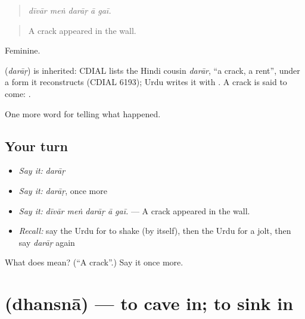 \begin{quote}
    
\end{quote}

\begin{quote}
\emph{dīvār meṅ darāṛ ā gaī.}
\end{quote}

\begin{quote}
A crack appeared in the wall.
\end{quote}

Feminine.

\begin{cousinweb}
\textbf{} (\emph{darāṛ}) is inherited: CDIAL lists the Hindi cousin \emph{darār}, \textquotedblleft{}a crack, a rent\textquotedblright{}, under a form it reconstructs (CDIAL 6193); Urdu writes it with \textbf{}. A crack is said to come: \textbf{  }.
\end{cousinweb}

\begin{grammarlens}[title={What you've built}]
One more word for telling what happened.
\end{grammarlens}

\subsection*{Your turn}
\begin{itemize}
\raggedright
  \item \emph{Say it:} \emph{darāṛ}
  \item \emph{Say it:} \emph{darāṛ}, once more
  \item \emph{Say it:} \emph{dīvār meṅ darāṛ ā gaī.} — A crack appeared in the wall.
  \item \emph{Recall:} say the Urdu for to shake (by itself), then the Urdu for a jolt, then say \emph{darāṛ} again
\end{itemize}

\begin{tcolorbox}[breakable,colback=teal!4,colframe=teal!35!black,title={Before you move on}]
What does  mean? (\textquotedblleft{}A crack\textquotedblright{}.) Say it once more.
\end{tcolorbox}
\section[\texorpdfstring{\ur{دھنسنا} (dhansnā)}{دھنسنا (dhansnā)}]{ (dhansnā) — to cave in; to sink in}

